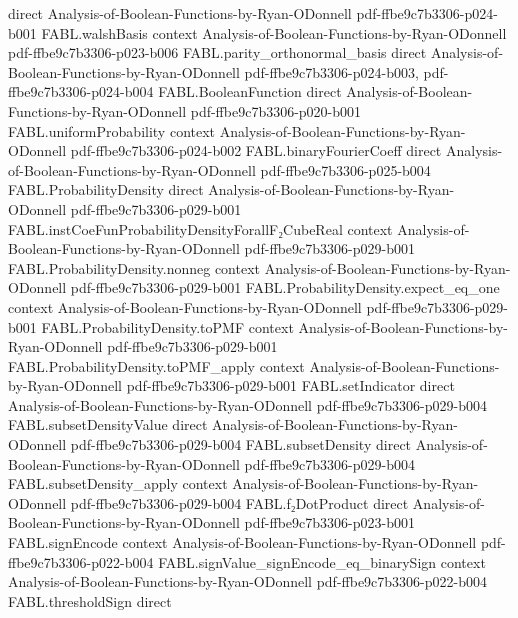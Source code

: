 \begin{theorem}
  {direct}
  {Analysis-of-Boolean-Functions-by-Ryan-ODonnell}
  {pdf-ffbe9c7b3306-p024-b001}
\proofstep
  {FABL.walshBasis}
  {context}
  {Analysis-of-Boolean-Functions-by-Ryan-ODonnell}
  {pdf-ffbe9c7b3306-p023-b006}
\proofstep
  {FABL.parity_orthonormal_basis}
  {direct}
  {Analysis-of-Boolean-Functions-by-Ryan-ODonnell}
  {pdf-ffbe9c7b3306-p024-b003,
    pdf-ffbe9c7b3306-p024-b004}
\proofstep
  {FABL.BooleanFunction}
  {direct}
  {Analysis-of-Boolean-Functions-by-Ryan-ODonnell}
  {pdf-ffbe9c7b3306-p020-b001}
\proofstep
  {FABL.uniformProbability}
  {context}
  {Analysis-of-Boolean-Functions-by-Ryan-ODonnell}
  {pdf-ffbe9c7b3306-p024-b002}
\proofstep
  {FABL.binaryFourierCoeff}
  {direct}
  {Analysis-of-Boolean-Functions-by-Ryan-ODonnell}
  {pdf-ffbe9c7b3306-p025-b004}
\proofstep
  {FABL.ProbabilityDensity}
  {direct}
  {Analysis-of-Boolean-Functions-by-Ryan-ODonnell}
  {pdf-ffbe9c7b3306-p029-b001}
\proofstep
  {FABL.instCoeFunProbabilityDensityForallF₂CubeReal}
  {context}
  {Analysis-of-Boolean-Functions-by-Ryan-ODonnell}
  {pdf-ffbe9c7b3306-p029-b001}
\proofstep
  {FABL.ProbabilityDensity.nonneg}
  {context}
  {Analysis-of-Boolean-Functions-by-Ryan-ODonnell}
  {pdf-ffbe9c7b3306-p029-b001}
\proofstep
  {FABL.ProbabilityDensity.expect_eq_one}
  {context}
  {Analysis-of-Boolean-Functions-by-Ryan-ODonnell}
  {pdf-ffbe9c7b3306-p029-b001}
\proofstep
  {FABL.ProbabilityDensity.toPMF}
  {context}
  {Analysis-of-Boolean-Functions-by-Ryan-ODonnell}
  {pdf-ffbe9c7b3306-p029-b001}
\proofstep
  {FABL.ProbabilityDensity.toPMF_apply}
  {context}
  {Analysis-of-Boolean-Functions-by-Ryan-ODonnell}
  {pdf-ffbe9c7b3306-p029-b001}
\proofstep
  {FABL.setIndicator}
  {direct}
  {Analysis-of-Boolean-Functions-by-Ryan-ODonnell}
  {pdf-ffbe9c7b3306-p029-b004}
\proofstep
  {FABL.subsetDensityValue}
  {direct}
  {Analysis-of-Boolean-Functions-by-Ryan-ODonnell}
  {pdf-ffbe9c7b3306-p029-b004}
\proofstep
  {FABL.subsetDensity}
  {direct}
  {Analysis-of-Boolean-Functions-by-Ryan-ODonnell}
  {pdf-ffbe9c7b3306-p029-b004}
\proofstep
  {FABL.subsetDensity_apply}
  {context}
  {Analysis-of-Boolean-Functions-by-Ryan-ODonnell}
  {pdf-ffbe9c7b3306-p029-b004}
\proofstep
  {FABL.f₂DotProduct}
  {direct}
  {Analysis-of-Boolean-Functions-by-Ryan-ODonnell}
  {pdf-ffbe9c7b3306-p023-b001}
\proofstep
  {FABL.signEncode}
  {context}
  {Analysis-of-Boolean-Functions-by-Ryan-ODonnell}
  {pdf-ffbe9c7b3306-p022-b004}
\proofstep
  {FABL.signValue_signEncode_eq_binarySign}
  {context}
  {Analysis-of-Boolean-Functions-by-Ryan-ODonnell}
  {pdf-ffbe9c7b3306-p022-b004}
\proofstep
  {FABL.thresholdSign}
  {direct}

\end{theorem}
